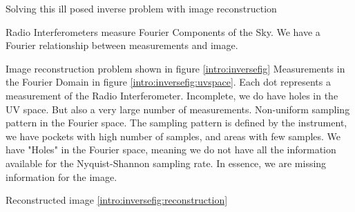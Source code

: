 Solving this ill posed inverse problem with image reconstruction


Radio Interferometers measure Fourier Components of the Sky. We have a Fourier relationship between measurements and image.

Image reconstruction problem shown in figure \ref{intro:inversefig}
Measurements in the Fourier Domain in figure \ref{intro:inversefig:uvspace}. Each dot represents a measurement of the Radio Interferometer. Incomplete, we do have holes in the UV space. But also a very large number of measurements. Non-uniform sampling pattern in the Fourier space. The sampling pattern is defined by the instrument, we have pockets with high number of samples, and areas with few samples. We have "Holes" in the Fourier space, meaning we do not have all the information available for the Nyquist-Shannon sampling rate. In essence, we are missing information for the image.

Reconstructed image \ref{intro:inversefig:reconstruction}



